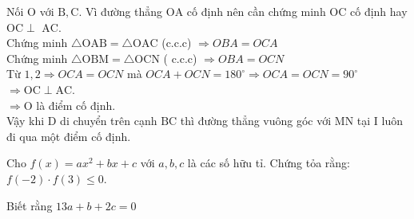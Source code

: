 \begin{bt}
{\begin{enumerate}
            Nối $\mathrm{O}$ với $\mathrm{B}, \mathrm{C}$. Vì đường thẳng $\mathrm{OA}$ cố định nên cần chứng minh $\mathrm{OC}$ cố định hay $\mathrm{OC} \perp$ $\mathrm{AC}$.\\[5px]
            Chứng minh $\triangle \mathrm{OAB}=\triangle \mathrm{OAC}$ (c.c.c) $\Rightarrow O B A=O C A$\\[5px]
            Chứng minh $\triangle \mathrm{OBM}=\triangle \mathrm{OCN}$ ( c.c.c) $\Rightarrow O B A=O C N$\\[5px]
            Từ $1,2 \Rightarrow O C A=O C N$ mà $O C A+O C N=180^{\circ} \Rightarrow O C A=O C N=90^{\circ}$\\[5px]
            $\Rightarrow \mathrm{OC} \perp \mathrm{AC}$.\\[5px]
            $\Rightarrow \mathrm{O}$ là điểm cố định.\\[5px]
            Vậy khi $\mathrm{D}$ di chuyển trên cạnh $\mathrm{BC}$ thì đường thẳng vuông góc với $\mathrm{MN}$ tại $\mathrm{I}$ luôn đi qua một điểm cố định.
        \end{enumerate}
    }
\end{bt}

\begin{bt}
    Cho $f(x)=a x^2+b x+c$ với $a, b, c$ là các số hữu tỉ. Chứng tỏa rằng: $f(-2) \cdot f(3) \leq 0$.

    Biết rằng $13 a+b+2 c=0$
\end{bt}


